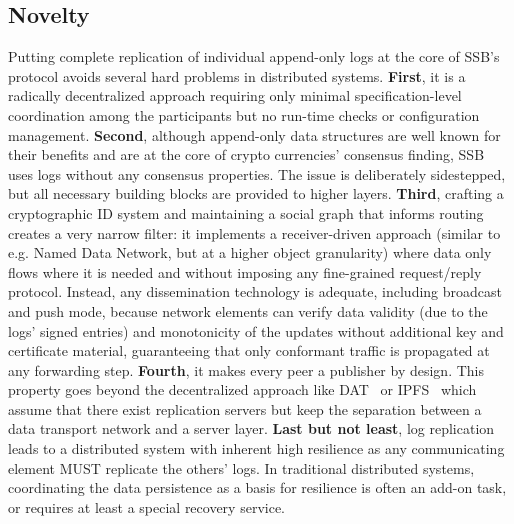 \documentclass[10pt,sigconf,rewiew]{acmart}
\begin{document}
\subsection*{Novelty}

Putting complete replication of individual append-only logs at the
core of SSB's protocol avoids several hard problems in distributed
systems. {\bf First}, it is a radically decentralized approach
requiring only minimal specification-level coordination among the
participants but no run-time checks or configuration
management.
{\bf Second}, although append-only
data structures are well known for their benefits and are at the core
of crypto currencies' consensus finding, SSB uses logs without any
consensus properties. The issue is deliberately sidestepped, but all
necessary building blocks are provided to higher layers.
{\bf Third}, crafting a cryptographic ID system and
maintaining a social graph that informs routing creates a very narrow
filter: it implements a receiver-driven approach (similar to
e.g. Named Data Network, but at a higher object granularity) where
data only flows where it is needed and without imposing any
fine-grained request/reply protocol. Instead, any dissemination
technology is adequate, including broadcast and push mode, because
network elements can verify data validity (due to the logs' signed
entries) and monotonicity of the updates without additional key and
certificate material, guaranteeing that only conformant traffic is
propagated at any forwarding step. {\bf Fourth}, it makes every peer a
publisher by design. This property goes beyond the decentralized
approach like DAT~\cite{datproject} or IPFS~\cite{benet2014ipfs} which assume that there
exist replication servers but keep the separation between a data
transport network and a server layer.
{\bf Last but not least}, log replication leads to a
distributed system with inherent high resilience as any communicating
element MUST replicate the others' logs. In traditional distributed
systems, coordinating the data persistence as a basis for resilience
is often an add-on task, or requires at least a special recovery
service.
\end{document}

